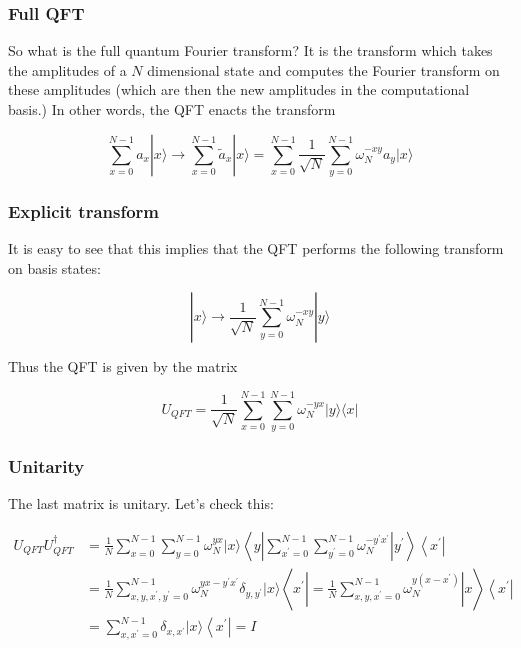 \documentclass{beamer}
\begin{document}
\begin{frame}
\frametitle{Full QFT}

So what is the full quantum Fourier transform? It is the transform
which takes the amplitudes of a $N$ dimensional state and computes the
Fourier transform on these amplitudes (which are then the new
amplitudes in the computational basis.) In other words, the QFT enacts
the transform

\begin{equation*}
\sum_{x=0}^{N-1} a_{x}|x\rangle \rightarrow \sum_{x=0}^{N-1} \tilde{a}_{x}|x\rangle=\sum_{x=0}^{N-1} \frac{1}{\sqrt{N}} \sum_{y=0}^{N-1} \omega_{N}^{-x y} a_{y}|x\rangle 
\end{equation*}
\end{frame}

\begin{frame}
\frametitle{Explicit transform}

It is easy to see that this implies that the QFT performs the following transform on basis states:

\begin{equation*}
|x\rangle \rightarrow \frac{1}{\sqrt{N}} \sum_{y=0}^{N-1} \omega_{N}^{-x y}|y\rangle
\end{equation*}

Thus the QFT is given by the matrix

\begin{equation*}
U_{Q F T}=\frac{1}{\sqrt{N}} \sum_{x=0}^{N-1} \sum_{y=0}^{N-1} \omega_{N}^{-y x}|y\rangle\langle x| 
\end{equation*}
\end{frame}

\begin{frame}
\frametitle{Unitarity}

The last  matrix is unitary. Let's check this:

\begin{align*}
U_{Q F T} U_{Q F T}^{\dagger} & =\frac{1}{N} \sum_{x=0}^{N-1} \sum_{y=0}^{N-1} \omega_{N}^{y x}|x\rangle\left\langle y\left|\sum_{x^{\prime}=0}^{N-1} \sum_{y^{\prime}=0}^{N-1} \omega_{N}^{-y^{\prime} x^{\prime}}\right| y^{\prime}\right\rangle\left\langle x^{\prime}\right| \\
& =\frac{1}{N} \sum_{x, y, x^{\prime}, y^{\prime}=0}^{N-1} \omega_{N}^{y x-y^{\prime} x^{\prime}} \delta_{y, y^{\prime}}|x\rangle\left\langle x^{\prime}\left|=\frac{1}{N} \sum_{x, y, x^{\prime}=0}^{N-1} \omega_{N}^{y\left(x-x^{\prime}\right)}\right| x\right\rangle\left\langle x^{\prime}\right| \\
& =\sum_{x, x^{\prime}=0}^{N-1} \delta_{x, x^{\prime}}|x\rangle\left\langle x^{\prime}\right|=I 
\end{align*}
\end{frame}
\end{document}
